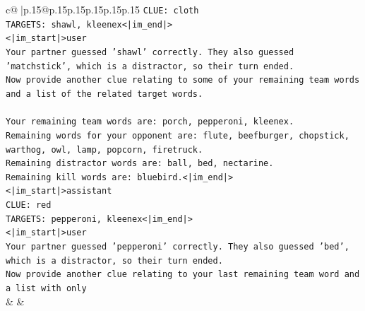 \documentclass{article}
\begin{document}
{\begin{supertabular}{c@{$\;$}|p{.15\linewidth}@{}p{.15\linewidth}p{.15\linewidth}p{.15\linewidth}p{.15\linewidth}p{.15\linewidth}}
{{{\texttt{CLUE: cloth} \\
\texttt{TARGETS: shawl, kleenex<|im\_end|>} \\
\texttt{<|im\_start|>user} \\
\texttt{Your partner guessed 'shawl' correctly. They also guessed 'matchstick', which is a distractor, so their turn ended.} \\
\texttt{Now provide another clue relating to some of your remaining team words and a list of the related target words.} \\
\\ 
\texttt{Your remaining team words are: porch, pepperoni, kleenex.} \\
\texttt{Remaining words for your opponent are: flute, beefburger, chopstick, warthog, owl, lamp, popcorn, firetruck.} \\
\texttt{Remaining distractor words are: ball, bed, nectarine.} \\
\texttt{Remaining kill words are: bluebird.<|im\_end|>} \\
\texttt{<|im\_start|>assistant} \\
\texttt{CLUE: red} \\
\texttt{TARGETS: pepperoni, kleenex<|im\_end|>} \\
\texttt{<|im\_start|>user} \\
\texttt{Your partner guessed 'pepperoni' correctly. They also guessed 'bed', which is a distractor, so their turn ended.} \\
\texttt{Now provide another clue relating to your last remaining team word and a list with only} \\
            }
        }
    }
    & & \\ \\


\end{supertabular}}
\end{document}

